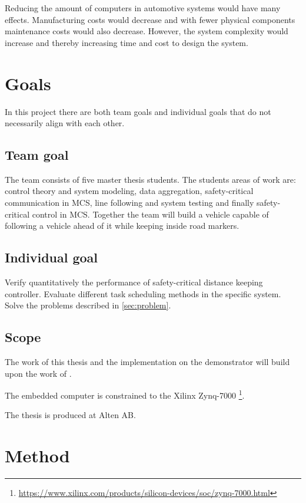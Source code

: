 Reducing the amount of computers in automotive systems would have many effects. Manufacturing costs would decrease and with fewer physical components maintenance costs would also decrease. However, the system complexity would increase and thereby increasing time and cost to design the system. %


\section{Goals}
In this project there are both team goals and individual goals that do not necessarily align with each other. 

\subsection{Team goal}
The team consists of five master thesis students. The students areas of work are: control theory and system modeling, data aggregation, safety-critical communication in MCS, line following and system testing and finally safety-critical control in MCS. Together the team will build a vehicle capable of following a vehicle ahead of it while keeping inside road markers.

\subsection{Individual goal}
Verify quantitatively the performance of safety-critical distance keeping controller. Evaluate different task scheduling methods in the specific system. Solve the problems described in \ref{sec:problem}.

\subsection{Scope}
The work of this thesis and the implementation on the demonstrator will build upon the work of \cite{zaki2016}.

The embedded computer is constrained to the Xilinx Zynq-7000 \footnote{\url{https://www.xilinx.com/products/silicon-devices/soc/zynq-7000.html}}. 

The thesis is produced at Alten AB.

\section{Method}
